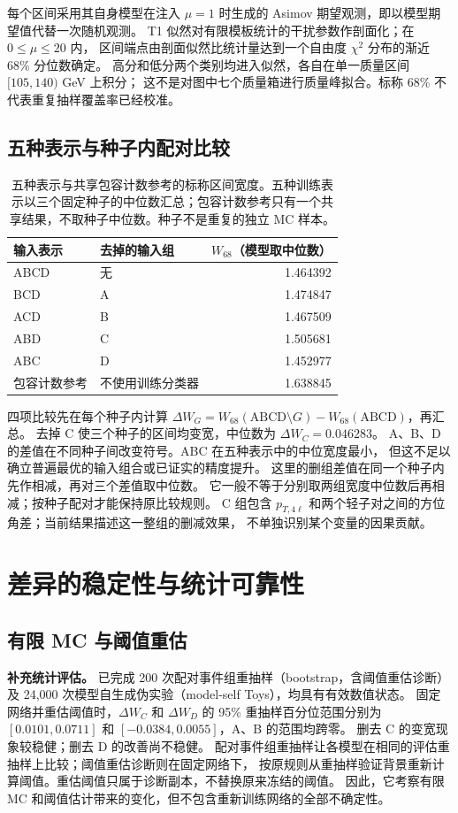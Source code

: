 \documentclass[11pt,a4paper,fontset=fandol,scheme=plain]{ctexart}
\begin{document}
每个区间采用其自身模型在注入 $\mu=1$ 时生成的 Asimov 期望观测，即以模型期望值代替一次随机观测。
T1 似然对有限模板统计的干扰参数作剖面化；在 $0\leq\mu\leq20$ 内，
区间端点由剖面似然比统计量达到一个自由度 $\chi^2$ 分布的渐近 68\% 分位数确定。
高分和低分两个类别均进入似然，各自在单一质量区间 $[105,140)$ GeV 上积分；
这不是对图中七个质量箱进行质量峰拟合。标称 68\% 不代表重复抽样覆盖率已经校准。

\subsection{五种表示与种子内配对比较}
\begin{table}[H]
\caption{五种表示与共享包容计数参考的标称区间宽度。五种训练表示以三个固定种子的中位数汇总；包容计数参考只有一个共享结果，不取种子中位数。种子不是重复的独立 MC 样本。}
\label{tab:widths}
\centering
\begin{tabular}{llr}
\toprule
输入表示 & 去掉的输入组 & $W_{68}$（模型取中位数） \\
\midrule
ABCD & 无 & 1.464392 \\
BCD & A & 1.474847 \\
ACD & B & 1.467509 \\
ABD & C & 1.505681 \\
ABC & D & 1.452977 \\
包容计数参考 & 不使用训练分类器 & 1.638845 \\
\bottomrule
\end{tabular}
\end{table}四项比较先在每个种子内计算
$\Delta W_G=W_{68}(\mathrm{ABCD}\setminus G)-W_{68}(\mathrm{ABCD})$，再汇总。
去掉 C 使三个种子的区间均变宽，中位数为 $\Delta W_C=0.046283$。
A、B、D 的差值在不同种子间改变符号。ABC 在五种表示中的中位宽度最小，
但这不足以确立普遍最优的输入组合或已证实的精度提升。
这里的删组差值在同一个种子内先作相减，再对三个差值取中位数。
它一般不等于分别取两组宽度中位数后再相减；按种子配对才能保持原比较规则。
C 组包含 $p_{T,4\ell}$ 和两个轻子对之间的方位角差；当前结果描述这一整组的删减效果，
不单独识别某个变量的因果贡献。

\FloatBarrier

\section{差异的稳定性与统计可靠性}

\subsection{有限 MC 与阈值重估}
\textbf{补充统计评估。} 已完成 200 次配对事件组重抽样（bootstrap，含阈值重估诊断）及
24,000 次模型自生成伪实验（model-self Toys），均具有有效数值状态。
固定网络并重估阈值时，$\Delta W_C$ 和 $\Delta W_D$ 的 95\% 重抽样百分位范围分别为
$[0.0101,0.0711]$ 和 $[-0.0384,0.0055]$，A、B 的范围均跨零。
删去 C 的变宽现象较稳健；删去 D 的改善尚不稳健。
配对事件组重抽样让各模型在相同的评估重抽样上比较；阈值重估诊断则在固定网络下，
按原规则从重抽样验证背景重新计算阈值。重估阈值只属于诊断副本，不替换原来冻结的阈值。
因此，它考察有限 MC 和阈值估计带来的变化，但不包含重新训练网络的全部不确定性。
\end{document}
